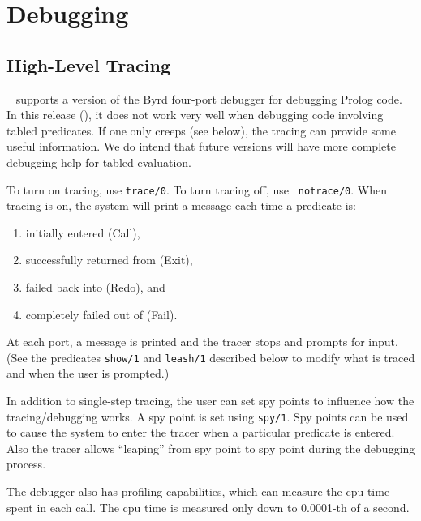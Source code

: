 \chapter{Debugging} \label{debugging}

\section{High-Level Tracing}

\ourprolog~ supports a version of the Byrd four-port debugger for debugging
Prolog code.  In this release (\version), it does not work very well
when debugging code involving tabled predicates.  If one only creeps
(see below), the tracing can provide some useful information.  We do
intend that future versions will have more complete debugging help for
tabled evaluation.

To turn on tracing, use {\tt trace/0}.  To turn tracing off, use {\tt
notrace/0}.  
When tracing is on, the system will print a message each time a
predicate is:
\begin{enumerate} 
\item initially entered (Call), 
\item successfully returned from (Exit), 
\item failed back into (Redo), and
\item completely failed out of (Fail).  
\end{enumerate}
At each port, a message is printed and the tracer stops and prompts
for input.  (See the predicates {\tt show/1} and {\tt leash/1} described
below to modify what is traced and when the user is prompted.)

In addition to single-step tracing, the user can set spy points to influence
how the tracing/debugging works.  A spy point is set using {\tt spy/1}.
Spy points can be used to cause the system to enter the tracer when
a particular predicate is entered. Also the tracer allows ``leaping'' from
spy point to spy point during the debugging process.

The debugger also has profiling capabilities, which can measure the cpu
time spent in each call. The cpu time is measured only down to 0.0001-th
of a second.

